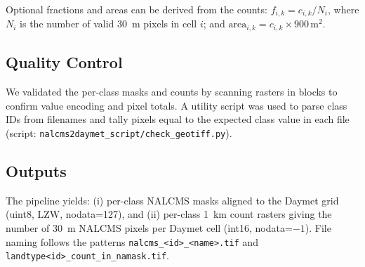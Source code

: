 Optional fractions and areas can be derived from the counts: \(f_{i,k} = c_{i,k}/N_i\), where \(N_i\) is the number of valid 30~m pixels in cell \(i\); and \(\text{area}_{i,k} = c_{i,k} \times 900\,\text{m}^2\).

\subsection{Quality Control}
We validated the per-class masks and counts by scanning rasters in blocks to confirm value encoding and pixel totals. A utility script was used to parse class IDs from filenames and tally pixels equal to the expected class value in each file (script: \texttt{nalcms2daymet\_script/check\_geotiff.py}).

\subsection{Outputs}
The pipeline yields: (i) per-class NALCMS masks aligned to the Daymet grid (uint8, LZW, nodata=127), and (ii) per-class 1~km count rasters giving the number of 30~m NALCMS pixels per Daymet cell (int16, nodata=\(-1\)). File naming follows the patterns \texttt{nalcms\_\textless id\textgreater\_\textless name\textgreater.tif} and \texttt{landtype\textless id\textgreater\_count\_in\_namask.tif}.


